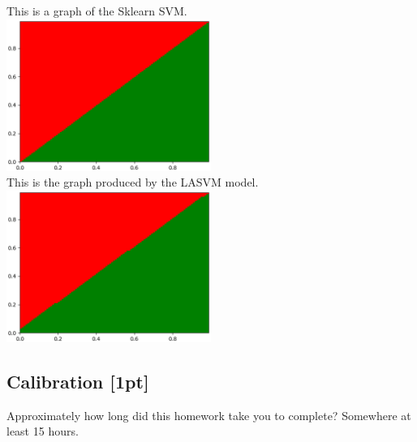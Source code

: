 \documentclass[submit]{harvardml}
\begin{document}
\begin{enumerate}
	This is a graph of the Sklearn SVM.  \\
	\includegraphics[width=0.5\textwidth]{sklearn_SVC.eps}\\
	This is the graph produced by the LASVM model. \\
	\includegraphics[width=0.5\textwidth]{lasvm.eps}\\
\end{enumerate}


\newpage

\subsection*{Calibration [1pt]}
Approximately how long did this homework take you to complete?
Somewhere at least 15 hours. 
\end{document}
